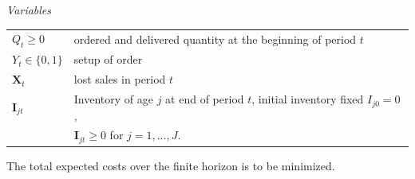 
\smallskip\noindent\emph{Variables}\\
\begin{tabular}{ll}
$Q_t \ge 0$ & ordered and delivered quantity at the beginning of period $t$\\
$Y_t \in \{0,1\}$ & setup of order\\
$\boldsymbol{X}_t$ & lost sales in period $t$\\
$\boldsymbol{I}_{jt}$ & Inventory of age $j$ at end of period $t$, initial inventory fixed  $I_{j0}=0$,\\
 & $\boldsymbol{I}_{jt} \ge 0$ for $j=1,\ldots,J$.\\
\end{tabular}

\smallskip\noindent
The total expected costs over the finite horizon is to be minimized.

